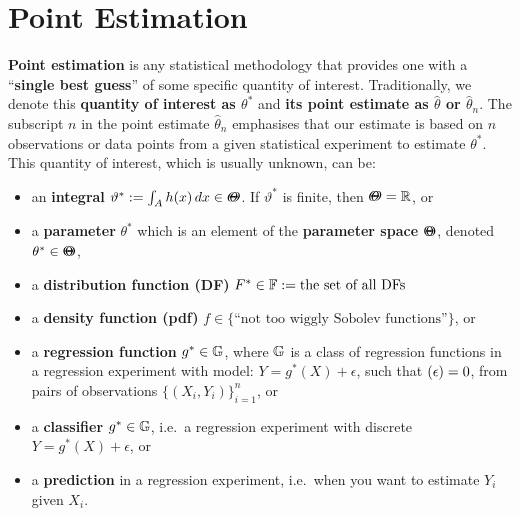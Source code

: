 \section{Point Estimation}\label{S:PointEstimation}
{\bf Point estimation} is any statistical methodology that provides one with a ``{\bf single best guess}'' of some specific quantity of interest.  Traditionally, we denote this {\bf quantity of interest as $\theta^*$} and {\bf its point estimate as $\widehat{\theta}$ or $\widehat{\theta}_n$}.  The subscript $n$ in the point estimate $\widehat{\theta}_n$ emphasises that our estimate is based on $n$ observations or data points from a given statistical experiment to estimate $\theta^*$.  This quantity of interest, which is usually unknown, can be: %
\begin{itemize}
\item an {\bf integral} $\vartheta^* := \int_A h(x)\,dx \in {\varTheta}\mspace{-11 mu}{\varTheta}$.  If $\vartheta^*$ is finite, then ${\varTheta}\mspace{-11 mu}{\varTheta} =  \mathbb{R}$, or %
\item a {\bf parameter} $\theta^*$ which is an element of the {\bf parameter space} ${\Theta}\mspace{-11 mu}{\Theta}$, denoted $\theta^* \in {\Theta}\mspace{-11 mu}{\Theta}$,
\item a {\bf distribution function (DF)} $F^* \in \mathbb{F} := \text{the set of all DFs}$
\item a {\bf density function (pdf)} $f \in \{ \text{``not too wiggly Sobolev functions''} \}$, or 
\item a {\bf regression function} $g^* \in \mathbb{G}$, where $\mathbb{G}$ is a class of regression functions in a regression experiment with model: $Y=g^*(X)+\epsilon$, such that $\mathscr{(}\epsilon)=0$, from pairs of observations $\{(X_i,Y_i)\}_{i=1}^n$, or
\item a {\bf classifier} $g^* \in \mathbb{G}$, i.e.~a regression experiment with discrete $Y = g^*(X)+\epsilon$, or 
\item a {\bf prediction} in a regression experiment, i.e.~when you want to estimate $Y_i$ given $X_i$. 
\end{itemize}

